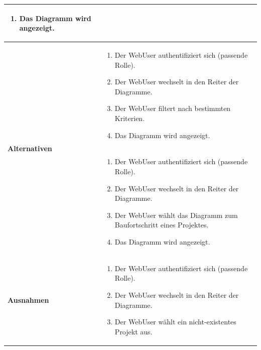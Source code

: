 \begin{longtable}[c]{|p{4cm}|p{10cm}|}
\begin{enumerate}
        \item Das Diagramm wird angezeigt.
    \end{enumerate}                                                                                                                               \\ \hline
    \multirow{2}{*}{\textbf{Alternativen}} &
    \begin{enumerate}
        \item Der WebUser authentifiziert sich (passende Rolle).
        \item Der WebUser wechselt in den Reiter der Diagramme.
        \item Der WebUser filtert nach bestimmten Kriterien.
        \item Das Diagramm wird angezeigt.
    \end{enumerate}                                                                                                                               \\\cline{2-2} &
    \begin{enumerate}
        \item Der WebUser authentifiziert sich (passende Rolle).
        \item Der WebUser wechselt in den Reiter der Diagramme.
        \item Der WebUser wählt das Diagramm zum Baufortschritt eines Projektes.
        \item Das Diagramm wird angezeigt.
    \end{enumerate}                                                                                                                               \\ \hline
    \multirow{2}{*}{\textbf{Ausnahmen}}    &
    \begin{enumerate} %
        \item Der WebUser authentifiziert sich (passende Rolle).
        \item Der WebUser wechselt in den Reiter der Diagramme.
        \item Der WebUser wählt ein nicht-existentes Projekt aus.

\end{enumerate}
\end{longtable}
